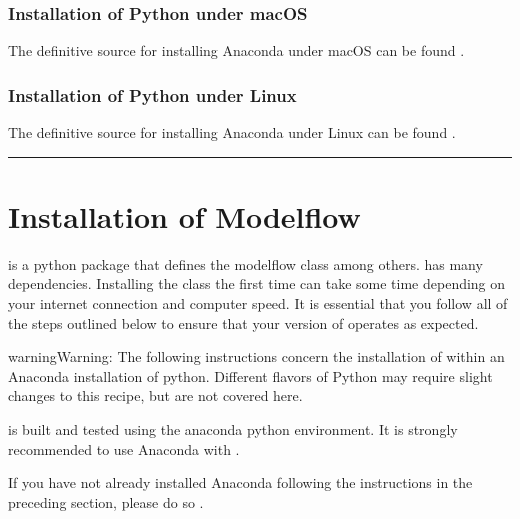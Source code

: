 \documentclass[letterpaper,10pt,english]{jupyterBook}
\begin{document}
\subsubsection{Installation of Python under macOS}
\label{\detokenize{content/03_Installation/InstallingPython:installation-of-python-under-macos}}
\sphinxAtStartPar
The definitive source for installing Anaconda under macOS can be found .


\subsubsection{Installation of Python under Linux}
\label{\detokenize{content/03_Installation/InstallingPython:installation-of-python-under-linux}}
\sphinxAtStartPar
The definitive source for installing Anaconda under Linux can be found .


\bigskip\hrule\bigskip


\sphinxstepscope


\section{Installation of Modelflow}
\label{\detokenize{content/03_Installation/InstallingModelFlow:installation-of-modelflow}}\label{\detokenize{content/03_Installation/InstallingModelFlow::doc}}
\sphinxAtStartPar
{} is a python package that defines the modelflow class  among others.   has many dependencies. Installing the class the first time can take some time depending on your internet connection and computer speed.  It is essential that you follow all of the steps outlined below to ensure that your version of  operates as expected.

\begin{sphinxadmonition}{warning}{Warning:}
\sphinxAtStartPar
The following instructions concern the installation of  within an Anaconda installation of python.  Different flavors of Python may require slight changes to this recipe, but are not covered here.

\sphinxAtStartPar
{} is built and tested using the anaconda python environment.  It is strongly recommended to use Anaconda with .

\sphinxAtStartPar
If you have not already installed Anaconda following the instructions in the preceding section, please do so .
\end{sphinxadmonition}
\end{document}
